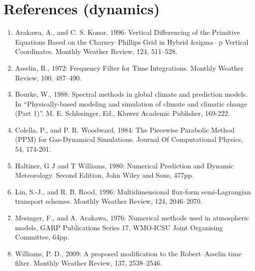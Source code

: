 \hypertarget{references-dynamics}{%
\section{References (dynamics)}\label{references-dynamics}}

\begin{enumerate}
\def\labelenumi{\arabic{enumi}.}
\item
  Arakawa, A., and C. S. Konor, 1996: Vertical Differencing of the
  Primitive Equations Based on the Charney--Phillips Grid in Hybrid
  \&sigma-- p Vertical Coordinates. Monthly Weather Review, 124,
  511--528.
\item
  Asselin, R., 1972: Frequency Filter for Time Integrations. Monthly
  Weather Review, 100, 487--490.
\item
  Bourke, W., 1988: Spectral methods in global climate and prediction
  models. In ``Physically-based modeling and simulation of climate and
  climatic change (Part 1)''. M. E. Schlesinger, Ed., Kluwer Academic
  Publisher, 169-222.
\item
  Colella, P., and P. R. Woodward, 1984: The Piecewise Parabolic Method
  (PPM) for Gas-Dynamical Simulations. Journal Of Computational Physics,
  54, 174-201.
\item
  Haltiner, G J and T Williams, 1980: Numerical Prediction and Dynamic
  Meteorology. Second Edition, John Wiley and Sons, 477pp.
\item
  Lin, S.-J., and R. B. Rood, 1996: Multidimensional flux-form
  semi-Lagrangian transport schemes. Monthly Weather Review, 124,
  2046--2070.
\item
  Mesinger, F., and A. Arakawa, 1976: Numerical methods used in
  atmospheric models, GARP Publications Series 17, WMO-ICSU Joint
  Organising Committee, 64pp.
\item
  Williams, P. D., 2009: A proposed modification to the Robert--Asselin
  time filter. Monthly Weather Review, 137, 2538--2546.
\end{enumerate}
